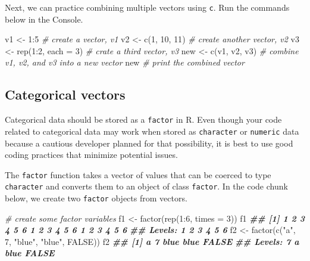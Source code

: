 \documentclass[
]{book}
\newenvironment{Shaded}{\begin{snugshade}}{\end{snugshade}}
\newcommand{\AttributeTok}[1]{\textcolor[rgb]{0.77,0.63,0.00}{#1}}
\newcommand{\CommentTok}[1]{\textcolor[rgb]{0.56,0.35,0.01}{\textit{#1}}}
\newcommand{\ConstantTok}[1]{\textcolor[rgb]{0.00,0.00,0.00}{#1}}
\newcommand{\DecValTok}[1]{\textcolor[rgb]{0.00,0.00,0.81}{#1}}
\newcommand{\DocumentationTok}[1]{\textcolor[rgb]{0.56,0.35,0.01}{\textbf{\textit{#1}}}}
\newcommand{\FunctionTok}[1]{\textcolor[rgb]{0.00,0.00,0.00}{#1}}
\newcommand{\NormalTok}[1]{#1}
\newcommand{\OtherTok}[1]{\textcolor[rgb]{0.56,0.35,0.01}{#1}}
\newcommand{\SpecialCharTok}[1]{\textcolor[rgb]{0.00,0.00,0.00}{#1}}
\newcommand{\StringTok}[1]{\textcolor[rgb]{0.31,0.60,0.02}{#1}}
\theoremstyle{definition}
\theoremstyle{definition}
\theoremstyle{definition}
\theoremstyle{definition}
\theoremstyle{remark}
\begin{document}
\begin{yourturn}
Next, we can practice combining multiple vectors using \texttt{c}. Run the commands below in the Console.

\begin{Shaded}
\begin{Highlighting}[]
\NormalTok{v1 }\OtherTok{\textless{}{-}} \DecValTok{1}\SpecialCharTok{:}\DecValTok{5} \CommentTok{\# create a vector, v1}
\NormalTok{v2 }\OtherTok{\textless{}{-}} \FunctionTok{c}\NormalTok{(}\DecValTok{1}\NormalTok{, }\DecValTok{10}\NormalTok{, }\DecValTok{11}\NormalTok{) }\CommentTok{\# create another vector, v2}
\NormalTok{v3 }\OtherTok{\textless{}{-}} \FunctionTok{rep}\NormalTok{(}\DecValTok{1}\SpecialCharTok{:}\DecValTok{2}\NormalTok{, }\AttributeTok{each =} \DecValTok{3}\NormalTok{) }\CommentTok{\# crate a third vector, v3}
\NormalTok{new }\OtherTok{\textless{}{-}} \FunctionTok{c}\NormalTok{(v1, v2, v3) }\CommentTok{\# combine v1, v2, and v3 into a new vector}
\NormalTok{new }\CommentTok{\# print the combined vector}
\end{Highlighting}
\end{Shaded}

\end{yourturn}

\hypertarget{categorical-vectors}{%
\subsection{Categorical vectors}\label{categorical-vectors}}

Categorical data should be stored as a \texttt{factor} in R. Even though your code related to categorical data may work when stored as \texttt{character} or \texttt{numeric} data because a cautious developer planned for that possibility, it is best to use good coding practices that minimize potential issues.

The \texttt{factor} function takes a vector of values that can be coerced to type \texttt{character} and converts them to an object of class \texttt{factor}. In the code chunk below, we create two \texttt{factor} objects from vectors.

\begin{Shaded}
\begin{Highlighting}[]
\CommentTok{\# create some factor variables}
\NormalTok{f1 }\OtherTok{\textless{}{-}} \FunctionTok{factor}\NormalTok{(}\FunctionTok{rep}\NormalTok{(}\DecValTok{1}\SpecialCharTok{:}\DecValTok{6}\NormalTok{, }\AttributeTok{times =} \DecValTok{3}\NormalTok{))}
\NormalTok{f1}
\DocumentationTok{\#\#  [1] 1 2 3 4 5 6 1 2 3 4 5 6 1 2 3 4 5 6}
\DocumentationTok{\#\# Levels: 1 2 3 4 5 6}
\NormalTok{f2 }\OtherTok{\textless{}{-}} \FunctionTok{factor}\NormalTok{(}\FunctionTok{c}\NormalTok{(}\StringTok{"a"}\NormalTok{, }\DecValTok{7}\NormalTok{, }\StringTok{"blue"}\NormalTok{, }\StringTok{"blue"}\NormalTok{, }\ConstantTok{FALSE}\NormalTok{))}
\NormalTok{f2}
\DocumentationTok{\#\# [1] a     7     blue  blue  FALSE}
\DocumentationTok{\#\# Levels: 7 a blue FALSE}
\end{Highlighting}
\end{Shaded}
\end{document}
